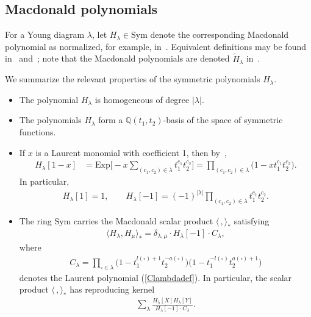 \documentclass[pdftex]{sigma}
\numberwithin{equation}{section}
\newcommand{\Sym}{\mathrm{Sym}}
\newcommand{\Exp}{\mathrm{Exp}}
\def\Q{\mathbb Q}
\begin{document}
\subsection{Macdonald polynomials}

For a Young diagram $\lambda$, let $H_{\lambda}\in \Sym$ denote the corresponding Macdonald polynomial as normalized, for example, in~\cite[equation~(11)]{GH}.
Equivalent definitions may be found in~\cite[Theorem~2.2]{GH} and~\cite[Definition 4.1]{M}; note that the Macdonald polynomials are denoted $\tilde{H}_{\lambda}$ in~\cite{GH,GHT}.

We summarize the relevant properties of the symmetric polynomials $H_{\lambda}$.
\begin{itemize}\itemsep=0pt
\item The polynomial $H_{\lambda}$ is homogeneous of degree $|\lambda|$.
\item The polynomials $H_{\lambda}$ form a $\Q(t_1,t_2)$-basis of the space of symmetric functions.
\item If $x$ is a Laurent monomial with coefficient 1, then by~\cite[Corollary~2.1]{GH}, \begin{align}\label{specialvalues2}
 H_{\lambda}[1-x]&=\Exp\biggl[{-}x \sum_{(c_1,c_2)\in \lambda} t_1^{c_1}t_2^{c_2}\biggr]= \prod_{(c_1,c_2)\in \lambda} \big(1-xt_1^{c_1}t_2^{c_2}\big).
 \end{align}
In particular,
\begin{gather} \label{specialvalues1}
H_{\lambda}[1]=1,\qquad
H_{\lambda}[-1]=(-1)^{|\lambda|}\prod_{(c_1,c_2)\in \lambda} t_1^{c_1}t_2^{c_2}.
\end{gather}

\item The ring $\Sym$ carries the Macdonald scalar product $\langle\,,\rangle_{*}$ satisfying
\begin{align*}\nonumber
\langle H_{\lambda}, H_{\mu}\rangle_* = \delta_{\lambda,\mu}\cdot H_{\lambda}[-1]\cdot C_{\lambda},
\end{align*}
where
\begin{gather*}
C_{\lambda}= \prod_{\square\in\lambda}{\big(1- t_1^{l(\square)+1}t_2^{-a(\square)}\big)\big(1-t_1^{-l(\square)}t_2^{a(\square)+1}\big)}
\end{gather*}
denotes the Laurent polynomial (\ref{Clambdadef}).
In particular, the scalar product $\langle\,,\rangle_{*}$ has reproducing kernel \begin{gather}
\label{cauchy}
\sum_{\lambda}\frac{H_{\lambda}[X] H_{\lambda}[Y]} {H_{\lambda}[-1] \cdot C_{\lambda}} .
\end{gather}
\end{itemize}
\end{document}
